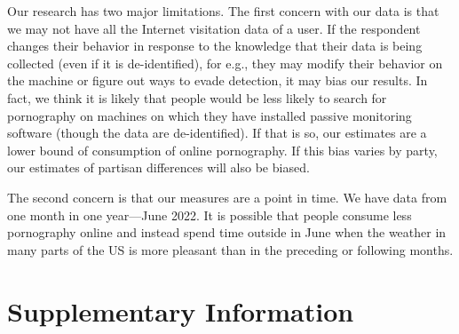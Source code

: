 \documentclass[12pt,twoside]{article}
\begin{document}
Our research has two major limitations. The first concern with our data is that we may not have all the Internet visitation data of a user. If the respondent changes their behavior in response to the knowledge that their data is being collected (even if it is de-identified), for e.g., they may modify their behavior on the machine or figure out ways to evade detection, it may bias our results. In fact, we think it is likely that people would be less likely to search for pornography on machines on which they have installed passive monitoring software (though the data are de-identified). If that is so, our estimates are a lower bound of consumption of online pornography. If this bias varies by party, our estimates of partisan differences will also be biased. 

The second concern is that our measures are a point in time. We have data from one month in one year---June 2022. It is possible that people consume less pornography online and instead spend time outside in June when the weather in many parts of the US is more pleasant than in the preceding or following months. 





\clearpage
\setcounter{table}{0}
\setcounter{figure}{0}
\setcounter{equation}{0}

\setcounter{secnumdepth}{0}
\section[Supplementary Information]{\large Supplementary Information}\label{sec:sm}
\normalsize

\newcommand{\smATitle}{Descriptive Analyses}
\newcommand{\smBTitle}{Online Pornography vs. Leisure}
\newcommand{\smCTitle}{Partisan Differences}
\newcommand{\smDTitle}{Missing at Random}
\newcommand{\smETitle}{Alternate Classifications of Pornography Sites}
\newcommand{\smFTitle}{Alternate Measures of Pornography Consumption}
\newcommand{\smGTitle}{Consumption of Pornography Among Independents}
\newcommand{\smHTitle}{Time of Consumption}
\end{document}
